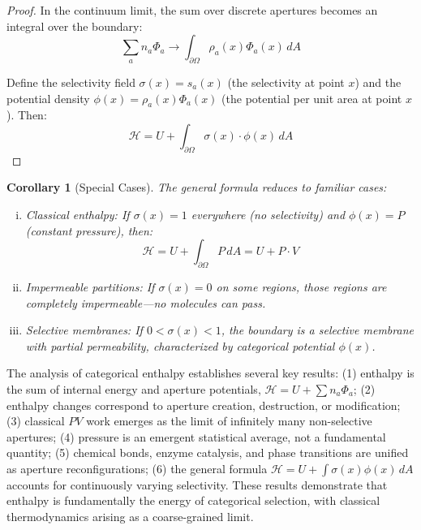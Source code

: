 \documentclass[12pt,a4paper]{article}
\newtheorem{corollary}[theorem]{Corollary}
\theoremstyle{definition}
\theoremstyle{remark}
\begin{document}
\begin{proof}
In the continuum limit, the sum over discrete apertures becomes an integral over the boundary:
\begin{equation}
\sum_a n_a \Phi_a \to \int_{\partial\Omega} \rho_a(x) \Phi_a(x) \, dA
\end{equation}

Define the selectivity field $\sigma(x) = s_a(x)$ (the selectivity at point $x$) and the potential density $\phi(x) = \rho_a(x) \Phi_a(x)$ (the potential per unit area at point $x$). Then:
\begin{equation}
\mathcal{H} = U + \int_{\partial\Omega} \sigma(x) \cdot \phi(x) \, dA
\end{equation}
\end{proof}

\begin{corollary}[Special Cases]
\label{cor:special_cases}
The general formula reduces to familiar cases:
\begin{enumerate}[(i)]
    \item \emph{Classical enthalpy}: If $\sigma(x) = 1$ everywhere (no selectivity) and $\phi(x) = P$ (constant pressure), then:
    \begin{equation}
    \mathcal{H} = U + \int_{\partial\Omega} P \, dA = U + P \cdot V
    \end{equation}
    
    \item \emph{Impermeable partitions}: If $\sigma(x) = 0$ on some regions, those regions are completely impermeable—no molecules can pass.
    
    \item \emph{Selective membranes}: If $0 < \sigma(x) < 1$, the boundary is a selective membrane with partial permeability, characterized by categorical potential $\phi(x)$.
\end{enumerate}
\end{corollary}

The analysis of categorical enthalpy establishes several key results: (1) enthalpy is the sum of internal energy and aperture potentials, $\mathcal{H} = U + \sum n_a \Phi_a$; (2) enthalpy changes correspond to aperture creation, destruction, or modification; (3) classical $PV$ work emerges as the limit of infinitely many non-selective apertures; (4) pressure is an emergent statistical average, not a fundamental quantity; (5) chemical bonds, enzyme catalysis, and phase transitions are unified as aperture reconfigurations; (6) the general formula $\mathcal{H} = U + \int \sigma(x) \phi(x) \, dA$ accounts for continuously varying selectivity. These results demonstrate that enthalpy is fundamentally the energy of categorical selection, with classical thermodynamics arising as a coarse-grained limit.
\end{document}
